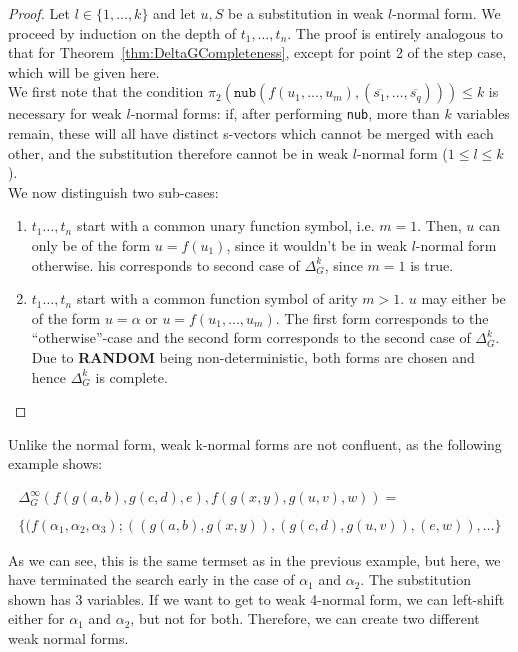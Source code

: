 \documentclass[a4paper, 11pt]{report}
\begin{document}
\begin{proof}
Let $l \in \{1,\dots,k\}$ and let $u,S$ be a substitution in weak $l$-normal form. We proceed by induction on the depth of $t_1,\dots,t_n$.
The proof is entirely analogous to that for Theorem~\ref{thm:DeltaGCompleteness}, except for point 2 of the step case, which will be given here.\\

We first note that the condition $\pi_2(\texttt{nub}(f(u_1,\dots,u_m), (\overline{s_1},\dots,\overline{s_q}))) \leq k$ is necessary for weak $l$-normal forms: if, after performing \texttt{nub}, more than $k$ variables remain, these will all have distinct s-vectors which cannot be merged with each other, and the substitution therefore cannot be in weak $l$-normal form ($1 \leq l \leq k$).\\

\noindent
We now distinguish two sub-cases:
  \begin{enumerate}
    \item $t_1\dots,t_n$ start with a common unary function symbol, i.e. $m = 1$. Then, $u$ can only be of the form $u=f(u_1)$, since it wouldn't be in weak $l$-normal form otherwise.
    his corresponds to second case of $\Delta_G^k$, since $m = 1$ is true.
    \item $t_1\dots,t_n$ start with a common function symbol of arity $m > 1$. $u$ may either be of the form $u=\alpha$ or $u=f(u_1,\dots,u_m)$. The first form corresponds to the ``otherwise''-case and the second form corresponds to the second case of $\Delta_G^k$. Due to \textbf{RANDOM} being non-deterministic, both forms are chosen and hence $\Delta_G^k$ is complete.
  \end{enumerate}
\end{proof}

\medskip

Unlike the normal form, weak k-normal forms are not confluent, as the following example shows:

$$
  \begin{array}{l}
    \Delta_G^\infty(f(g(a,b),g(c,d),e), f(g(x,y),g(u,v),w)) =\\
    \\
    \{(f(\alpha_1,\alpha_2,\alpha_3); ((g(a,b),g(x,y)), (g(c,d),g(u,v)), (e,w)),\dots \}
  \end{array}
$$

As we can see, this is the same termset as in the previous example, but here, we have terminated the search early in the case of $\alpha_1$ and $\alpha_2$. The substitution shown has 3 variables. If we want to get to weak 4-normal form, we can left-shift either for $\alpha_1$ and $\alpha_2$, but not for both. Therefore, we can create two different weak normal forms.\\
\end{document}
